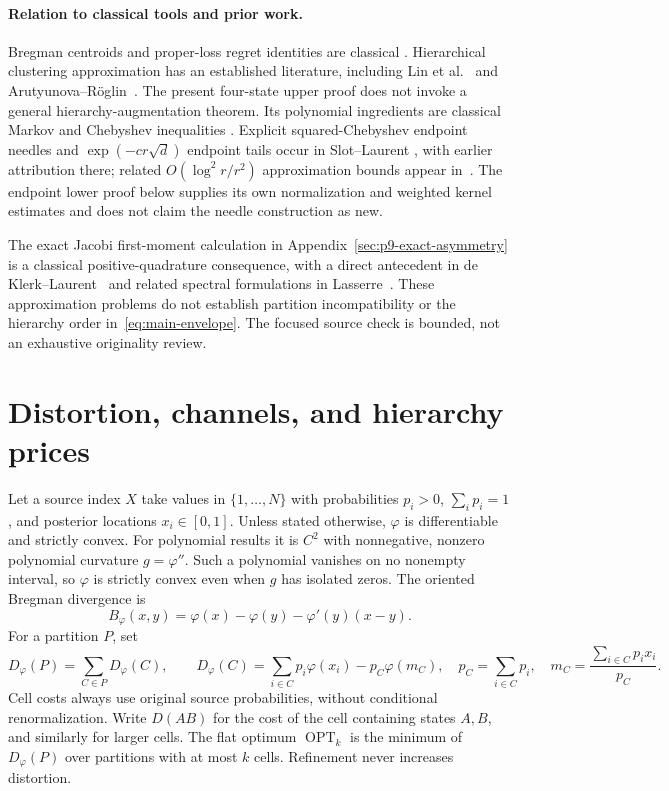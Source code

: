 \documentclass[11pt]{article}
\theoremstyle{definition}\newtheorem{definition}[theorem]{Definition}
\theoremstyle{remark}\newtheorem{remark}[theorem]{Remark}
\newcommand{\OPT}{\operatorname{OPT}}
\begin{document}
\paragraph{Relation to classical tools and prior work.}
Bregman centroids and proper-loss regret identities are classical
\cite{banerjee,gneiting,reid}. Hierarchical clustering approximation has
an established literature, including Lin et al.~\cite{lin} and
Arutyunova--R\"oglin~\cite{arutyunova}. The present four-state upper proof
does not invoke a general hierarchy-augmentation theorem. Its polynomial
ingredients are classical Markov and Chebyshev inequalities
\cite{shadrin,dlmf}. Explicit squared-Chebyshev endpoint needles and
$\exp(-c r\sqrt d)$ endpoint tails occur in Slot--Laurent
\cite[Section~4.1]{slot2019}, with earlier attribution there; related
$O(\log^2 r/r^2)$ approximation bounds appear in~\cite{slot2020}.
The endpoint lower proof below supplies its own normalization and weighted
kernel estimates and does not claim the needle construction as new.

The exact Jacobi first-moment calculation in Appendix~\ref{sec:p9-exact-asymmetry}
is a classical positive-quadrature consequence, with a direct antecedent in
de Klerk--Laurent~\cite{deklerk} and related spectral formulations in
Lasserre~\cite{lasserre}. These approximation problems do not establish
partition incompatibility or the hierarchy order in~\eqref{eq:main-envelope}.
The focused source check is bounded, not an exhaustive originality review.

\section{Distortion, channels, and hierarchy prices}
\label{sec:definitions}
Let a source index $X$ take values in $\{1,\ldots,N\}$ with probabilities
$p_i>0$, $\sum_i p_i=1$, and posterior locations $x_i\in[0,1]$.
Unless stated otherwise, $\varphi$ is differentiable and strictly convex.
For polynomial results it is $C^2$ with nonnegative, nonzero polynomial
curvature $g=\varphi''$. Such a polynomial vanishes on no nonempty
interval, so $\varphi$ is strictly convex even when $g$ has isolated zeros.
The oriented Bregman divergence is
\[
 B_\varphi(x,y)=\varphi(x)-\varphi(y)-\varphi'(y)(x-y).
\]
For a partition $P$, set
\begin{equation}
 D_\varphi(P)=\sum_{C\in P}D_\varphi(C),\qquad
 D_\varphi(C)=\sum_{i\in C}p_i\varphi(x_i)-p_C\varphi(m_C),
 \quad p_C=\sum_{i\in C}p_i,
 \quad m_C=\frac{\sum_{i\in C}p_ix_i}{p_C}.
 \label{eq:distortion}
\end{equation}
Cell costs always use original source probabilities, without conditional
renormalization. Write $D(AB)$ for the cost of the cell containing states
$A,B$, and similarly for larger cells. The flat optimum $\OPT_k$ is the
minimum of $D_\varphi(P)$ over partitions with at most $k$ cells.
Refinement never increases distortion.
\end{document}
